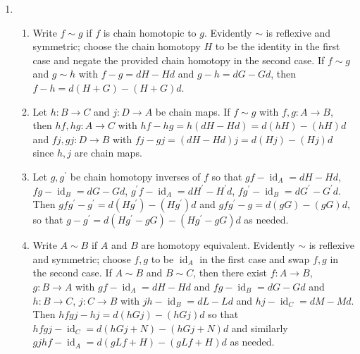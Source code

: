 \documentclass[11pt,leqno]{article}
\theoremstyle{plain}
\theoremstyle{definition}
\numberwithin{equation}{section}
\numberwithin{lem}{section}
\DeclareMathOperator{\id}{id}
\begin{document}
\begin{enumerate}
    \item \begin{enumerate}
      \item Write $f\sim g$ if $f$ is chain homotopic to $g$. Evidently $\sim$ is reflexive and symmetric; choose the chain homotopy $H$ to be the identity in the first case and negate the provided chain homotopy in the second case. If $f\sim g$ and $g\sim h$ with $f-g = dH-Hd$ and $g-h = dG-Gd$, then $f-h = d(H+G)-(H+G)d$.
      \item Let $h\colon B\to C$ and $j\colon D\to A$ be chain maps. If $f\sim g$ with $f,g\colon A\to B$, then $hf,hg\colon A\to C$ with $hf-hg = h(dH-Hd) = d(hH)-(hH)d$ and $fj,gj\colon D\to B$ with $fj-gj = (dH-Hd)j = d(Hj)-(Hj)d$ since $h,j$ are chain maps.
      \item Let $g,g^\prime$ be chain homotopy inverses of $f$ so that $gf-\id_A = dH-Hd$, $fg-\id_B = dG-Gd$, $g^\prime f-\id_A = dH^\prime -H^\prime d$, $fg^\prime -\id_B = dG^\prime -G^\prime d$. Then $gfg^\prime - g^\prime = d(Hg^\prime)-(Hg^\prime)d$ and $gfg^\prime - g = d(gG)-(gG)d$, so that $g-g^\prime = d(Hg^\prime-gG)-(Hg^\prime-gG)d$ as needed.
      \item Write $A\sim B$ if $A$ and $B$ are homotopy equivalent. Evidently $\sim$ is reflexive and symmetric; choose $f,g$ to be $\id_A$ in the first case and swap $f,g$ in the second case. If $A\sim B$ and $B\sim C$, then there exist $f\colon A\to B$, $g\colon B\to A$ with $gf-\id_A = dH-Hd$ and $fg-\id_B = dG-Gd$ and $h\colon B\to C$, $j\colon C\to B$ with $jh-\id_B = dL-Ld$ and $hj-\id_C = dM-Md$. Then $hfgj - hj = d(hGj) - (hGj)d$ so that $hfgj-\id_C = d(hGj+N) - (hGj+N)d$ and similarly $gjhf - \id_A = d(gLf+H) - (gLf+H)d$ as needed.
    \end{enumerate}
\end{enumerate}
\end{document}
